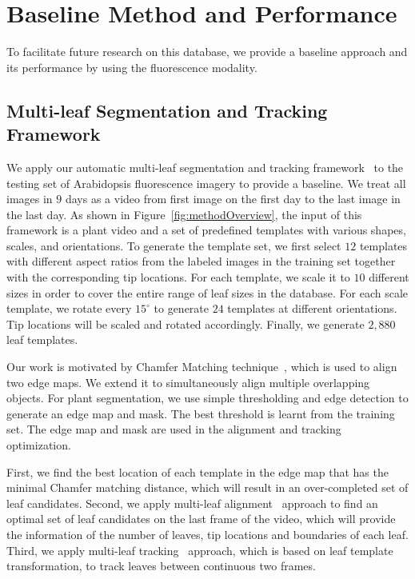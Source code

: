 \section{Baseline Method and Performance}
\label{sec:baseline}

To facilitate future research on this database, we provide a baseline approach and its performance by using the fluorescence modality.

\subsection{Multi-leaf Segmentation and Tracking Framework}
We apply our automatic multi-leaf segmentation and tracking framework~\cite{yin2014a,yin2014b} to the testing set of Arabidopsis fluorescence imagery to provide a baseline.
We treat all images in $9$ days as a video from first image on the first day to the last image in the last day.
As shown in Figure~\ref{fig:methodOverview}, the input of this framework is a plant video and a set of predefined templates with various shapes, scales, and orientations.
To generate the template set, we first select $12$ templates with different aspect ratios from the labeled images in the training set together with the corresponding tip locations.
For each template, we scale it to $10$ different sizes in order to cover the entire range of leaf sizes in the database.
For each scale template, we rotate every $15^{\circ}$ to generate $24$ templates at different orientations.
Tip locations will be scaled and rotated accordingly.
Finally, we generate $2,880$ leaf templates.



Our work is motivated by Chamfer Matching technique~\cite{barrow1977parametric}, which is used to align two edge maps.
We extend it to simultaneously align multiple overlapping objects.
For plant segmentation, we use simple thresholding and edge detection to generate an edge map and mask.
The best threshold is learnt from the training set.
The edge map and mask are used in the alignment and tracking optimization.

First, we find the best location of each template in the edge map that has the minimal Chamfer matching distance, which will result in an over-completed set of leaf candidates.
Second, we apply multi-leaf alignment~\cite{yin2014a} approach to find an optimal set of leaf candidates on the last frame of the video, which will provide the information of the number of leaves, tip locations and boundaries of each leaf.
Third, we apply multi-leaf tracking~\cite{yin2014b} approach, which is based on leaf template transformation, to track leaves between continuous two frames.

